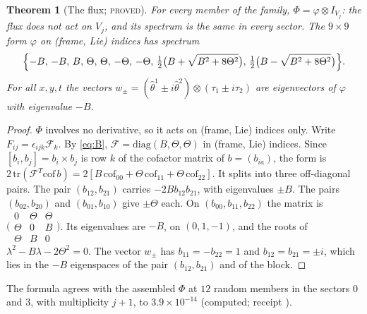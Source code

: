 \documentclass[11pt]{article}
\newtheorem{theorem}{Theorem}[section]
\theoremstyle{definition}
\theoremstyle{remark}
\newcommand{\PROVED}{\textsc{proved}}
\begin{document}
\begin{theorem}[The flux; \PROVED]\label{thm:flux}
For every member of the family, $\Phi=\varphi\otimes I_{V_j}$: the flux does not act on $V_j$, and its spectrum is the
same in every sector. The $9\times9$ form $\varphi$ on (frame, Lie) indices has spectrum
\[
  \Bigl\{-B,\,-B,\,B,\,\Theta,\,\Theta,\,-\Theta,\,-\Theta,\,\tfrac12\bigl(B+\sqrt{B^2+8\Theta^2}\bigr),\,
  \tfrac12\bigl(B-\sqrt{B^2+8\Theta^2}\bigr)\Bigr\}.
\]
For all $x,y,t$ the vectors $w_\pm=(\hat\theta^1\pm i\hat\theta^2)\otimes(\tau_1\pm i\tau_2)$ are eigenvectors of
$\varphi$ with eigenvalue $-B$.
\end{theorem}
\begin{proof}
$\Phi$ involves no derivative, so it acts on (frame, Lie) indices only. Write $F_{ij}=\epsilon_{ijk}\mathcal F_k$. By
\eqref{eq:B}, $\mathcal F=\mathrm{diag}(B,\Theta,\Theta)$ in (frame, Lie) indices. Since $[b_i,b_j]=b_i\times b_j$ is
row $k$ of the cofactor matrix of $b=(b_{ia})$, the form is
$2\,\mathrm{tr}(\mathcal F^T\mathrm{cof}\,b)=2[B\,\mathrm{cof}_{00}+\Theta\,\mathrm{cof}_{11}+\Theta\,\mathrm{cof}_{22}]$.
It splits into three off-diagonal pairs. The pair $(b_{12},b_{21})$ carries $-2Bb_{12}b_{21}$, with eigenvalues $\pm B$.
The pairs $(b_{02},b_{20})$ and $(b_{01},b_{10})$ give $\pm\Theta$ each. On $(b_{00},b_{11},b_{22})$ the matrix is
$\bigl(\begin{smallmatrix}0&\Theta&\Theta\\ \Theta&0&B\\ \Theta&B&0\end{smallmatrix}\bigr)$. Its eigenvalues are $-B$, on
$(0,1,-1)$, and the roots of $\lambda^2-B\lambda-2\Theta^2=0$. The vector $w_\pm$ has $b_{11}=-b_{22}=1$ and
$b_{12}=b_{21}=\pm i$, which lies in the $-B$ eigenspaces of the pair $(b_{12},b_{21})$ and of the block.
\end{proof}

The formula agrees with the assembled $\Phi$ at $12$ random members in the sectors $0$ and $3$, with multiplicity $j+1$,
to $3.9\times10^{-14}$ (computed; receipt ).
\end{document}
